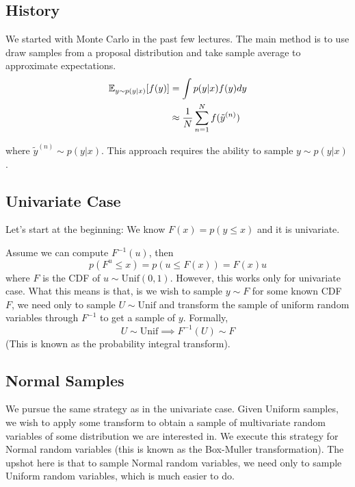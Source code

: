 \documentclass{article}
\begin{document}

\subsection{History} 
We started with Monte Carlo in the past few lectures. The main method is to use draw samples from a proposal distribution and take sample average to approximate expectations.
\begin{align*}
    \mathbb{E}_{y \sim p(y|x)}[f(y)] & = \int p(y|x) f(y) dy \\
    & \approx \frac{1}{N} \sum_{n=1}^{N} f(\tilde{y}^{(n)})
\end{align*}

where $\tilde{y}^{(n)} \sim p(y|x)$. This approach requires the ability to sample $y \sim p(y|x)$.

\subsection{Univariate Case}
Let's start at the beginning:  We know $F(x) = p(y \leq x)$ and it is univariate. 





Assume we can compute $F^{-1}(u)$, then 
$$ p(F^{u}\leq x) = p(u\leq F(x)) = F(x) u$$
where $F$ is the CDF of $u \sim \text{Unif}(0,1)$. However, this works only for univariate case. What this means is that, is we wish to sample $y \sim F$ for some known CDF $F$, we need only to sample $U\sim \text{Unif}$ and transform the sample of uniform random variables through $F^{-1}$ to get a sample of $y$. Formally, 
\[
U \sim \text{Unif} \implies F^{-1}(U) \sim F 
\]
(This is known as the probability integral transform).

\subsection{Normal Samples}
We pursue the same strategy as in the univariate case. Given Uniform samples, we wish to apply some transform to obtain a sample of multivariate random variables of some distribution we are interested in. We execute this strategy for Normal random variables (this is known as the Box-Muller transformation). The upshot here is that to sample Normal random variables, we need only to sample Uniform random variables, which is much easier to do.
\end{document}

